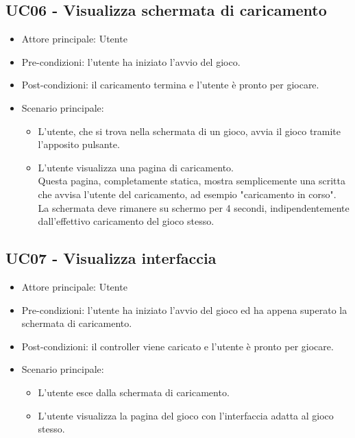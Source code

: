 \subsection{UC06 - Visualizza schermata di caricamento}
\begin{itemize}
    \item Attore principale: Utente
    \item Pre-condizioni: l'utente ha iniziato l'avvio del gioco.
    \item Post-condizioni: il caricamento termina e l'utente è pronto per giocare.
    \item Scenario principale: \begin{itemize}
        \item L'utente, che si trova nella schermata di un gioco, avvia il gioco tramite l'apposito pulsante.
        \item L'utente visualizza una pagina di caricamento.\\ Questa pagina, completamente statica, mostra semplicemente una scritta che avvisa l'utente del caricamento, ad esempio "caricamento in corso".\\ La schermata deve rimanere su schermo per 4 secondi, indipendentemente dall'effettivo caricamento del gioco stesso.
    \end{itemize}
\end{itemize}

\subsection{UC07 - Visualizza interfaccia}
\begin{itemize}
    \item Attore principale: Utente
    \item Pre-condizioni: l'utente ha iniziato l'avvio del gioco ed ha appena superato la schermata di caricamento.
    \item Post-condizioni: il controller viene caricato e l'utente è pronto per giocare.
    \item Scenario principale: \begin{itemize}
        \item L'utente esce dalla schermata di caricamento.
        \item L'utente visualizza la pagina del gioco con l'interfaccia adatta al gioco stesso.
    \end{itemize}
\end{itemize}

